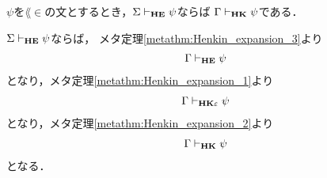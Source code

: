 	\begin{screen}
		\begin{metathm}
			$\psi$を$\lang{\in}$の文とするとき，$\Sigma \vdash_{{\scriptsize \mbox{{\bf HE}}}} \psi$ならば
			$\Gamma \vdash_{{\scriptsize \mbox{{\bf HK}}}} \psi$である．
		\end{metathm}
	\end{screen}
	
	\begin{sketch}
		$\Sigma \vdash_{{\scriptsize \mbox{{\bf HE}}}} \psi$ならば，
		メタ定理\ref{metathm:Henkin_expansion_3}より
		\begin{align}
			\Gamma \vdash_{{\scriptsize \mbox{{\bf HE}}}} \psi
		\end{align}
		となり，メタ定理\ref{metathm:Henkin_expansion_1}より
		\begin{align}
			\Gamma \vdash_{{\scriptsize \mbox{{\bf HK$\varepsilon$}}}} \psi
		\end{align}
		となり，メタ定理\ref{metathm:Henkin_expansion_2}より
		\begin{align}
			\Gamma \vdash_{{\scriptsize \mbox{{\bf HK}}}} \psi
		\end{align}
		となる．
		\QED
	\end{sketch}